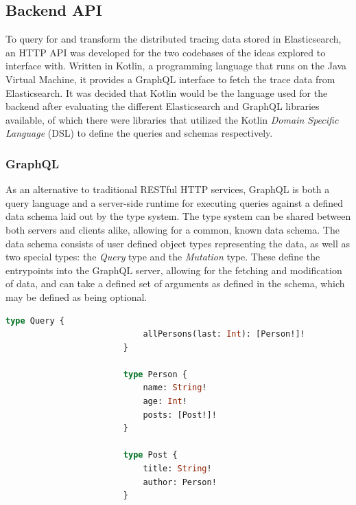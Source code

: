 \documentclass[12pt,pdftex,titlepage]{report}
\begin{document}


            \subsection{Backend API}
                To query for and transform the distributed tracing data stored in Elasticsearch, an HTTP API was developed for the two codebases of the ideas explored to interface with.
                Written in Kotlin, a programming language that runs on the Java Virtual Machine, it provides a GraphQL interface to fetch the trace data from Elasticsearch. It was 
                decided that Kotlin would be the language used for the backend after evaluating the different Elasticsearch and GraphQL libraries available, of which there were libraries 
                that utilized the Kotlin \textit{Domain Specific Language} (DSL) to define the queries and schemas respectively.
                
                \subsubsection{GraphQL}
                    As an alternative to traditional RESTful HTTP services, GraphQL is both a query language and a server-side runtime for executing queries against a defined data schema
                    laid out by the type system. The type system can be shared between both servers and clients alike, allowing for a common, known data schema. The data schema consists of 
                    user defined object types representing the data, as well as two special types: the \textit{Query} type and the \textit{Mutation} type. These define the entrypoints into
                    the GraphQL server, allowing for the fetching and modification of data, and can take a defined set of arguments as defined in the schema, which may be defined as being
                    optional.\newpage

                    \begin{lstlisting}[caption={A basic GraphQL schema, defining a query and data types.}, language=GraphQL, gobble=24]
                        type Query {
                            allPersons(last: Int): [Person!]!
                        }

                        type Person {
                            name: String!
                            age: Int!
                            posts: [Post!]!
                        }

                        type Post {
                            title: String!
                            author: Person!
                        }
                    \end{lstlisting}
                    
\end{document}
